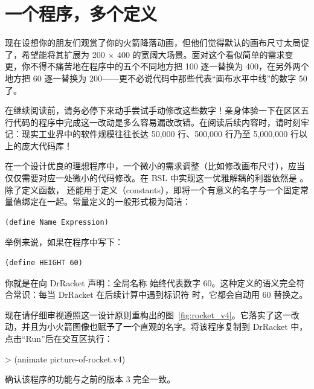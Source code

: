 \section{一个程序，多个定义}
\label{sec:prologue:one_program_many_definitions}

现在设想你的朋友们观赏了你的火箭降落动画，但他们觉得默认的画布尺寸太局促了，希望能将其扩展为 200 $\times$ 400 的宽阔大场景。面对这个看似简单的需求变更，你不得不痛苦地在程序中的五个不同地方把 100 逐一替换为 400，在另外两个地方把 60 逐一替换为 200——更不必说代码中那些代表“画布水平中线”的数字 50 了。

\begin{notebox}[动手体验硬编码之痛]
在继续阅读前，请务必停下来动手尝试手动修改这些数字！亲身体验一下在区区五行代码的程序中完成这一改动是多么容易漏改改错。在阅读后续内容时，请时刻牢记：现实工业界中的软件规模往往长达 50,000 行、500,000 行乃至 5,000,000 行以上的庞大代码库！
\end{notebox}

在一个设计优良的理想程序中，一个微小的需求调整（比如修改画布尺寸），应当仅仅需要对应一处微小的代码修改。在 BSL 中实现这一优雅解耦的利器依然是 。除了定义函数， 还能用于定义（constants），即将一个有意义的名字与一个固定常量值绑定在一起。常量定义的一般形式极为简洁：
\begin{lstlisting}[language=BSL]
(define Name Expression)
\end{lstlisting}

举例来说，如果在程序中写下：
\begin{lstlisting}[language=BSL]
(define HEIGHT 60)
\end{lstlisting}
你就是在向 DrRacket 声明：全局名称  始终代表数字 60。这种定义的语义完全符合常识：每当 DrRacket 在后续计算中遇到标识符  时，它都会自动用 60 替换之。

现在请仔细审视遵照这一设计原则重构出的图~\ref{fig:rocket_v4}。它落实了这一改动，并且为小火箭图像也赋予了一个直观的名字。将该程序复制到 DrRacket 中，点击“Run”后在交互区执行：
\begin{replbox}
> (animate picture-of-rocket.v4)
\end{replbox}
确认该程序的功能与之前的版本 3 完全一致。

